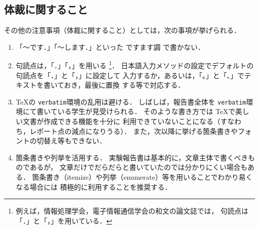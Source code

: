 \documentclass{ujarticle}[11pt]
\newcommand{\COMMENT}[1]{}
\begin{document}
    \subsection{体裁に関すること}
     
    その他の注意事項（体裁に関すること）としては，次の事項が挙げられる．
    \begin{enumerate}
    \item 「〜です．」「〜します．」といった {\gt ですます調} で書かない．
     
    \item 句読点は，「．」「，」を用いる
    \footnote{例えば，情報処理学会，電子情報通信学会の和文の論文誌では，
    句読点は「．」と「，」を用いている．}．
    \COMMENT{
    \verb|~/.emacs| ファイルに次の式を記述をしておけば，デフォルトの
    句読点が「．」および「，」となる．
    \begin{quote}
    \begin{verbatim}
    ;; 2バイト文字の句読点設定 
    (setq its-hira-period "．") ;; 「．」は全角
    (setq its-hira-comma  "，") ;; 「，」は全角
    \end{verbatim}
    \end{quote}
    上記設定をしていない場合に「．」および「，」をタイプする場合，
    日本語モードでそれぞれ\verb|Z-.|（大文字のZをタイプ後，ピリオド(.)をタイプ），
    \verb|Z-,|（大文字のZをタイプ後，カンマ(,)をタイプ）を入力する．
    } %
    日本語入力メソッドの設定でデフォルトの句読点を「．」と「，」に設定して
    入力するか，あるいは，「。」と「、」でテキストを書いておき，最後に置換
    する等で対応する．
     
    \item \TeX の \verb|verbatim|環境の乱用は避ける．
    しばしば，報告書全体を \verb|verbatim|環境にて書いている学生が見受けられる．
    そのような書き方では \TeX で美しい文書が作成できる機能を十分に
    利用できていないことになる（すなわち，レポート点の減点になりうる）．
    また，次以降に挙げる箇条書きやフォントの切替え等もできない．
     
    \item 箇条書きや列挙を活用する．
    実験報告書は基本的に，文章主体で書くべきものであるが，
    文章だけでだらだらと書いていたのでは分かりにくい場合もある．
    箇条書き（itemize）や列挙（enumerate）等を用いることでわかり易くなる場合には
    積極的に利用することを推奨する．
     

\end{enumerate}
\end{document}
